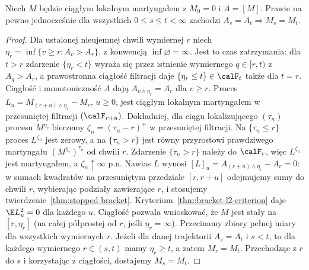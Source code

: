 \begin{lemat}
\label{lem:bracket-flat-interval}
Niech $M$ będzie ciągłym lokalnym martyngałem
z $M_0=0$ i $A=[M]$. Prawie na pewno
jednocześnie dla wszystkich $0\le s\le t<\infty$
zachodzi $A_s=A_t\Longrightarrow M_s=M_t$.
\end{lemat}
\begin{proof}
Dla ustalonej nieujemnej chwili wymiernej $r$
niech $\eta_r=\inf\{v\ge r:A_v>A_r\}$,
z konwencją $\inf\varnothing=\infty$.
Jest to czas zatrzymania: dla $t>r$ zdarzenie
$\{\eta_r<t\}$ wyraża się przez istnienie
wymiernego $q\in[r,t)$ z $A_q>A_r$,
a prawostronna ciągłość filtracji daje
$\{\eta_r\le t\}\in\calF_t$ także dla $t=r$.
Ciągłość i monotoniczność $A$ dają
$A_{v\wedge\eta_r}=A_r$ dla $v\ge r$.
Proces $L_u=M_{(r+u)\wedge\eta_r}-M_r$,
$u\ge0$, jest ciągłym lokalnym martyngałem
w przesuniętej filtracji $(\calF_{r+u})$.
Dokładniej, dla ciągu lokalizującego $(\tau_n)$
procesu $M^{\eta_r}$ bierzemy
$\zeta_n=(\tau_n-r)^+$ w przesuniętej filtracji.
Na $\{\tau_n\le r\}$ proces $L^{\zeta_n}$
jest zerowy, a na $\{\tau_n>r\}$
jest równy przyrostowi prawdziwego martyngału
$(M^{\eta_r})^{\tau_n}$ od chwili $r$.
Zdarzenie $\{\tau_n>r\}$ należy do $\calF_r$,
więc $L^{\zeta_n}$ jest martyngałem,
a $\zeta_n\uparrow\infty$ p.n.
Nawias $L$ wynosi
$[L]_u=A_{(r+u)\wedge\eta_r}-A_r=0$:
w sumach kwadratów na przesuniętym przedziale
$[r,r+u]$ odejmujemy sumy do chwili $r$,
wybierając podziały zawierające $r$, i stosujemy
twierdzenie~\ref{thm:stopped-bracket}.
Kryterium~\ref{thm:bracket-l2-criterion}
daje $\E L_u^2=0$ dla każdego $u$.
Ciągłość pozwala wnioskować, że $M$
jest stały na $[r,\eta_r]$ (na całej
półprostej od $r$, jeśli $\eta_r=\infty$).
Przecinamy zbiory pełnej miary dla wszystkich
wymiernych $r$. Jeżeli dla danej trajektorii
$A_s=A_t$ i $s<t$, to dla każdego wymiernego
$r\in(s,t)$ mamy $\eta_r\ge t$, a zatem
$M_r=M_t$. Przechodząc z $r$ do $s$
i korzystając z ciągłości, dostajemy $M_s=M_t$.
\end{proof}


